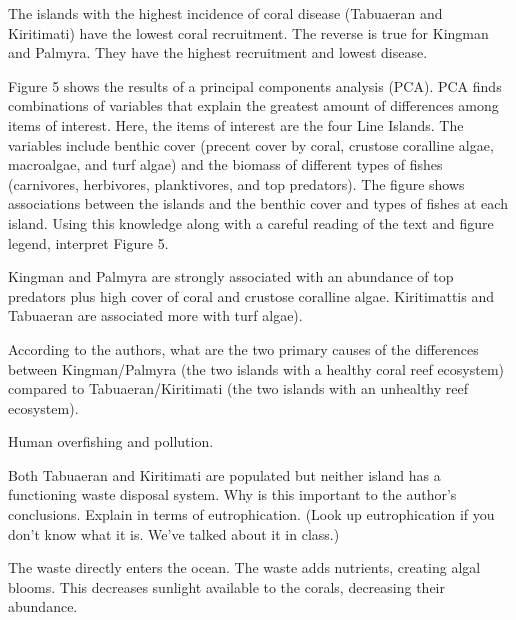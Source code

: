 \documentclass[11pt, addpoints]{exam}
\begin{document}
\begin{questions}
\begin{solution}
The islands with the highest incidence of coral disease (Tabuaeran and Kiritimati) have the lowest coral recruitment. The reverse is true for Kingman and Palmyra. They have the highest recruitment and lowest disease.
\end{solution}

\question[3]
Figure 5 shows the results of a principal components analysis (PCA). PCA finds combinations of variables that explain the greatest amount of differences among items of interest. Here, the items of interest are the four Line Islands. The variables include benthic cover (precent cover by coral, crustose coralline algae, macroalgae, and turf algae) and the biomass of different types of fishes (carnivores, herbivores, planktivores, and top predators). The figure shows associations between the islands and the benthic cover and types of fishes at each island. Using this knowledge along with a careful reading of the text and figure legend, interpret Figure 5.  

\begin{solution}
Kingman and Palmyra are strongly associated with an abundance of top predators plus high cover of coral and crustose coralline algae. Kiritimattis and Tabuaeran are associated more with turf algae).
\end{solution}


\question[2]
According to the authors, what are the two primary causes of the differences between Kingman/Palmyra (the two islands with a healthy coral reef ecosystem) compared to Tabuaeran/Kiritimati (the two islands with an unhealthy reef ecosystem). 
\begin{solution}
Human overfishing and pollution.  
\end{solution}


\question[5]
Both Tabuaeran and Kiritimati are populated but neither island has a functioning waste disposal system. Why is this important to the author's conclusions. Explain in terms of eutrophication. (Look up eutrophication if you don't know what it is. We've talked about it in class.)
\begin{solution}
The waste directly enters the ocean. The waste adds nutrients, creating algal blooms. This decreases sunlight available to the corals, decreasing their abundance.
\end{solution}
\end{questions}
\end{document}
